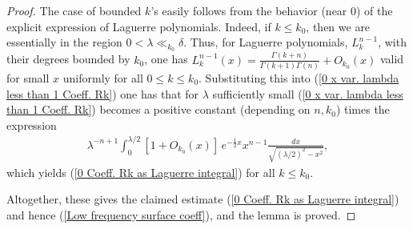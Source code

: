 \documentclass[11pt, reqno]{amsart}
\theoremstyle{plain}
\theoremstyle{remark}
\theoremstyle{example}
\theoremstyle{definition}
\numberwithin{equation}{section}
\begin{document}
\begin{proof}
The case of bounded $k$'s easily follows from the behavior (near $0$) of the explicit expression of Laguerre polynomials. Indeed, if $k \leq k_{0}$, then we are essentially in the region $0 < \lambda \ll_{k_{0}} \delta$. Thus, for  Laguerre polynomials, $L_{k}^{n-1}$, with their degrees bounded by $k_{0}$, one has $L_{k}^{n-1}(x) = \frac{\Gamma(k+n)}{\Gamma(k+1) \Gamma(n)} + O_{k_{0}}(x)$ valid for small $x$ uniformly for all $0 \leq k \leq k_{0}$. Substituting this into
(\ref{0 x var. lambda less than 1 Coeff. Rk}) one has that for $\lambda$ sufficiently small (\ref{0 x var. lambda less than 1 Coeff. Rk}) becomes a positive constant (depending on $n, k_{0}$) times the expression
\begin{equation}\label{0 x var. lambda less than 1 Coeff. Rk 1}
   \begin{split}
        \lambda^{-n +1}  \int_{0}^{ \lambda /2}  [1 + O_{k_{0}}(x)] \, e^{-\frac{1}{2} x }  x^{n-1} \frac{dx}{\sqrt{(\lambda/2)^2 -  x^2}},
   \end{split}
\end{equation}
which yields (\ref{0 Coeff. Rk as Laguerre integral}) for all $k \leq k_{0}$. 

Altogether, these gives the claimed estimate (\ref{0 Coeff. Rk as Laguerre integral}) and hence (\ref{Low frequency surface coeff}), and the lemma is proved.
\end{proof}
\end{document}
